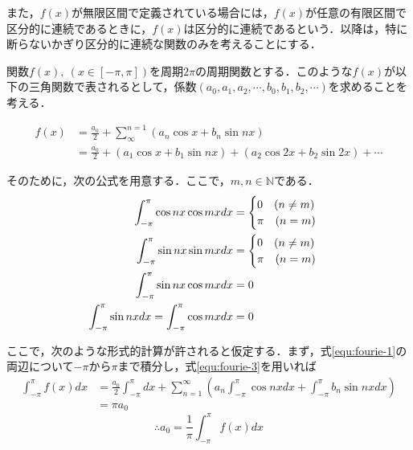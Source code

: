\documentclass[11pt,a4paper,titlepage]{jsreport}
\theoremstyle{definition}
\begin{document}
また，$f(x)$が無限区間で定義されている場合には，$f(x)$が任意の有限区間で区分的に連続であるときに，$f(x)$は区分的に連続であるという．以降は，特に断らないかぎり区分的に連続な関数のみを考えることにする．

関数$f(x),\ (x\in [-\pi,\pi])$を周期$2\pi$の周期関数とする．このような$f(x)$が以下の三角関数で表されるとして，係数$(a_0,a_1,a_2,\cdots,b_0,b_1,b_2,\cdots)$を求めることを考える．

\begin{equation}
  \begin{split}
    f(x) & = \frac{a_0}{2} + \sum_{\infty}^{n=1} (a_n \cos x + b_n \sin nx)\\
       & = \frac{a_0}{2} + (a_1 \cos x + b_1 \sin nx) + (a_2 \cos 2x + b_2 \sin 2x) + \cdots
  \label{equ:fourie-1}
\end{split}
\end{equation}

そのために，次の公式を用意する．ここで，$m,n\in \mathbb{N}$である．
\begin{align}
  \int_{-\pi}^{\pi} \cos nx \cos mx dx                        & = \begin{cases}
                                                                    0 \quad (n\neq m) \\
                                                                    \pi \quad (n=m)
                                                                  \end{cases} \notag       \\
  \int_{-\pi}^{\pi} \sin nx \sin mx dx                        & = \begin{cases}
                                                                    0 \quad (n\neq m) \\
                                                                    \pi \quad (n=m)   \\
                                                                  \end{cases} \notag       \\
  \int_{-\pi}^{\pi} \sin nx \cos mx dx                        & = 0   \label{equ:fourie-2} \\
  \int_{-\pi}^{\pi} \sin nx dx = \int_{-\pi}^{\pi} \cos mx dx & = 0 \label{equ:fourie-3}
\end{align}

ここで，次のような形式的計算が許されると仮定する．まず，式\eqref{equ:fourie-1}の両辺について$-\pi$から$\pi$まで積分し，式\eqref{equ:fourie-3}を用いれば
\begin{align*}
  \int_{-\pi}^{\pi} f(x)dx & = \frac{a_0}{2}\int_{-\pi}^{\pi} dx + \sum_{n=1}^{\infty} (a_n \int_{-\pi}^{\pi}\cos nx dx+ \int_{-\pi}^{\pi}b_n \sin nx dx) \\
                           & = \pi a_0
\end{align*}
\begin{equation}
  \label{equ:fourie-a0}
  \therefore a_0 = \frac{1}{\pi}\int_{-\pi}^{\pi} f(x) dx
\end{equation}
\end{document}

